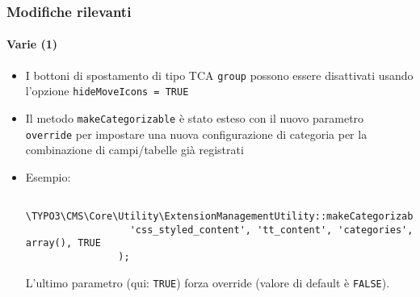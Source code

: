 \begin{frame}[fragile]
	\frametitle{Modifiche rilevanti}
	\framesubtitle{Varie (1)}

	\begin{itemize}

		\item I bottoni di spostamento di tipo TCA \texttt{group} possono essere
			disattivati usando l'opzione \texttt{hideMoveIcons = TRUE}

		\item Il metodo \texttt{makeCategorizable} è stato esteso con il nuovo parametro
			\texttt{override} per impostare una nuova configurazione di categoria per la combinazione
			di campi/tabelle già registrati

		\item Esempio:

			\begin{lstlisting}
				\TYPO3\CMS\Core\Utility\ExtensionManagementUtility::makeCategorizable(
				  'css_styled_content', 'tt_content', 'categories', array(), TRUE
				);
			\end{lstlisting}

			\small
				L'ultimo parametro (qui: \texttt{TRUE}) forza override (valore di default è \texttt{FALSE}).
			\normalsize

	\end{itemize}

\end{frame}


